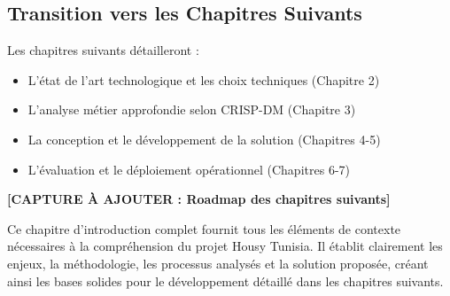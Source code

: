 \subsection{Transition vers les Chapitres Suivants}

Les chapitres suivants détailleront :
\begin{itemize}
    \item L'état de l'art technologique et les choix techniques (Chapitre 2)
    \item L'analyse métier approfondie selon CRISP-DM (Chapitre 3)
    \item La conception et le développement de la solution (Chapitres 4-5)
    \item L'évaluation et le déploiement opérationnel (Chapitres 6-7)
\end{itemize}

\textbf{[CAPTURE À AJOUTER : Roadmap des chapitres suivants]}

\begin{resultbox}
Ce chapitre d'introduction complet fournit tous les éléments de contexte nécessaires à la compréhension du projet Housy Tunisia. Il établit clairement les enjeux, la méthodologie, les processus analysés et la solution proposée, créant ainsi les bases solides pour le développement détaillé dans les chapitres suivants.
\end{resultbox}
